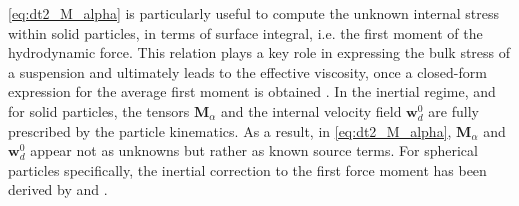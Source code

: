 \ref{eq:dt2_M_alpha} is particularly useful to compute the unknown internal stress within solid particles, in terms of surface integral, i.e. the first moment of the hydrodynamic force.
This relation plays a key role in expressing the bulk stress of a suspension and ultimately leads to the effective viscosity, once a closed-form expression for the average first moment is obtained \citep{batchelor1970stress}. 
In the inertial regime, and for solid particles, the tensors $\textbf{M}_\alpha$ and the internal velocity field $\textbf{w}_d^0$ are fully prescribed by the particle kinematics. 
As a result, in \ref{eq:dt2_M_alpha}, $\textbf{M}_\alpha$ and $\textbf{w}_d^0$ appear not as unknowns but rather as known source terms.
For spherical particles specifically, the inertial correction to the first force moment has been derived by \citet{hwang1989modeling} and  \citet{lhuillier1996contribution}.






